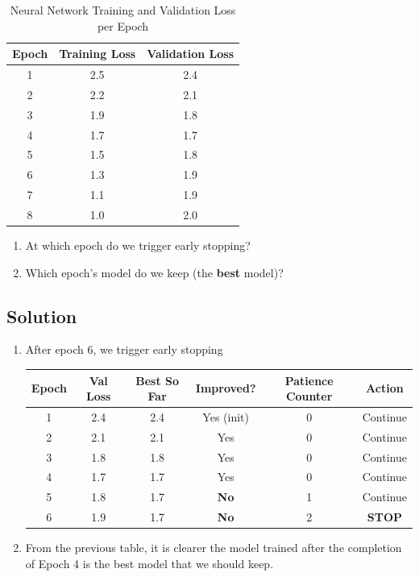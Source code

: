 \documentclass[12pt, xcolor=dvipsnames,svgnames,x11names]{article}
\begin{document}
\begin{table}[h]
    \centering
    \caption{Neural Network Training and Validation Loss per Epoch}
    \label{tab:loss_history}
    \vspace{10pt}
  
    \begin{tabular}{ccc}
        \toprule
        \textbf{Epoch} & \textbf{Training Loss} & \textbf{Validation Loss} \\
        \midrule
        1 & 2.5 & 2.4 \\
        2 & 2.2 & 2.1 \\
        3 & 1.9 & 1.8 \\
        4 & 1.7 & 1.7 \\
        5 & 1.5 & 1.8 \\
        6 & 1.3 & 1.9 \\
        7 & 1.1 & 1.9 \\
        8 & 1.0 & 2.0 \\
        \bottomrule
    \end{tabular}
\end{table}

\begin{enumerate}
\item At which epoch do we trigger early stopping?
\item Which epoch’s model do we keep (the \textbf{best} model)?
\end{enumerate}

\subsection{Solution}

\begin{enumerate}
\item After epoch 6, we trigger early stopping

\begin{table}[h]
    \centering
    \label{tab:early_stopping}
    \begin{tabular}{|c|c|c|c|c|c|}
        \hline
        \textbf{Epoch} & \textbf{Val Loss} & \textbf{Best So Far} & \textbf{Improved?} & \textbf{Patience Counter} & \textbf{Action} \\
        \hline
        1 & 2.4 & 2.4 & Yes (init) & 0 & Continue \\
        \hline
        2 & 2.1 & 2.1 & Yes & 0 & Continue \\
        \hline
        3 & 1.8 & 1.8 & Yes & 0 & Continue \\
        \hline
        4 & 1.7 & 1.7 & Yes & 0 & Continue \\
        \hline
        5 & 1.8 & 1.7 & \textbf{No} & 1 & Continue \\
        \hline
        6 & 1.9 & 1.7 & \textbf{No} & 2 & \textbf{STOP} \\
        \hline
    \end{tabular}
\end{table}

\item From the previous table, it is clearer the model trained after the completion of Epoch 4 is the best model that we should keep.
\end{enumerate}
\end{document}
